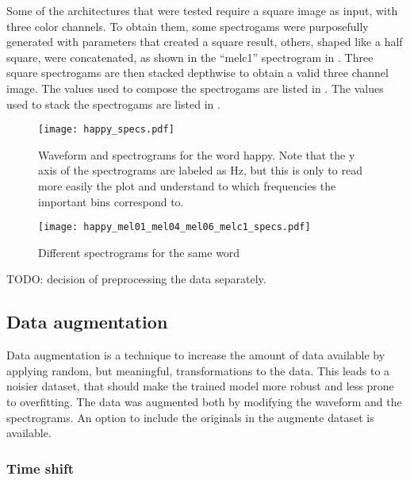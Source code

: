 Some of the architectures that were tested require a square image as input,
with three color channels.
To obtain them, some spectrogams were purposefully generated with parameters
that created a square result, others, shaped like a half square, were
concatenated, as shown in the ``melc1'' spectrogram in
.
Three square spectrogams are then stacked depthwise to obtain a valid three
channel image.
The values used to compose the spectrogams are listed in .
The values used to stack the spectrogams are listed in .

\begin{figure}[t!]
    \centering
    \texttt{[image: happy\_specs.pdf]}
    \caption{
    Waveform and spectrograms for the word happy. Note that the y axis of the
spectrograms are labeled as Hz, but this is only to read more easily the plot
and understand to which frequencies the important bins correspond to. }%
    \label{fig:happy_specs}
\end{figure}


\begin{figure}[t!]
    \centering
    \texttt{[image: happy\_mel01\_mel04\_mel06\_melc1\_specs.pdf]}
    \caption{Different spectrograms for the same word}%
    \label{fig:happy_mel01_mel04_mel06_melc1_specs}
\end{figure}

TODO: decision of preprocessing the data separately.

\subsection{Data augmentation}
\label{sec:data_augmentation}

Data augmentation is a technique to increase the amount of data available by
applying random, but meaningful, transformations to the data. This leads to a
noisier dataset, that should make the trained model more robust and less prone
to overfitting. The data was augmented both by modifying the waveform and the
spectrograms. An option to include the originals in the augmente dataset is
available.

\subsubsection{Time shift}

